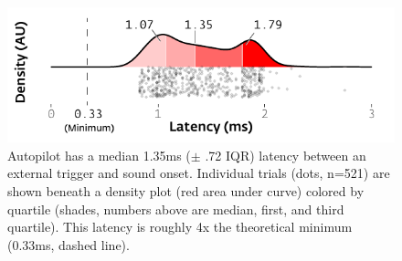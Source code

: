 \begin{figure}[hb!]
\caption{Autopilot has a median 1.35ms ($\pm$ .72 IQR) latency between an external trigger and sound onset. Individual trials (dots, n=521) are shown beneath a density plot (red area under curve) colored by quartile (shades, numbers above are median, first, and third quartile). This latency is roughly 4x the theoretical minimum (0.33ms, dashed line).}
\label{fig:lags}
\includegraphics{figures/sound_latency.pdf}
\end{figure}